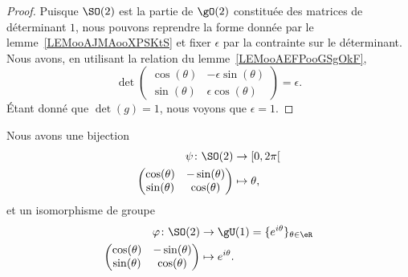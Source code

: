 \begin{proof}
	Puisque \( \SO(2)\) est la partie de \( \gO(2)\) constituée des matrices de déterminant \( 1\), nous pouvons reprendre la forme donnée par le lemme~\ref{LEMooAJMAooXPSKtS} et fixer \( \epsilon\) par la contrainte sur le déterminant. Nous avons, en utilisant la relation du lemme~\ref{LEMooAEFPooGSgOkF},
	\begin{equation}
		\det\begin{pmatrix}
			\cos(\theta) & -\epsilon\sin(\theta) \\
			\sin(\theta) & \epsilon\cos(\theta)
		\end{pmatrix}=\epsilon.
	\end{equation}
    Étant donné que \( \det(g)=1\), nous voyons que \( \epsilon=1\).
\end{proof}

\begin{corollary}        \label{CORooGGVUooLQYGET}
	Nous avons une bijection
	\begin{equation}
		\begin{aligned}
			\psi\colon \SO(2) & \to \mathopen[ 0 , 2\pi \mathclose[ \\
			\begin{pmatrix}
				\cos(\theta) & -\sin(\theta) \\
				\sin(\theta) & \cos(\theta)
			\end{pmatrix}
			                  & \mapsto \theta,
		\end{aligned}
	\end{equation}
	et un isomorphisme de groupe
	\begin{equation}
		\begin{aligned}
			\varphi\colon \SO(2) & \to \gU(1)=\{  e^{i\theta} \}_{\theta\in \eR} \\
			\begin{pmatrix}
				\cos(\theta) & -\sin(\theta) \\
				\sin(\theta) & \cos(\theta)
			\end{pmatrix}
			                     & \mapsto  e^{i\theta}.
		\end{aligned}
	\end{equation}
\end{corollary}

